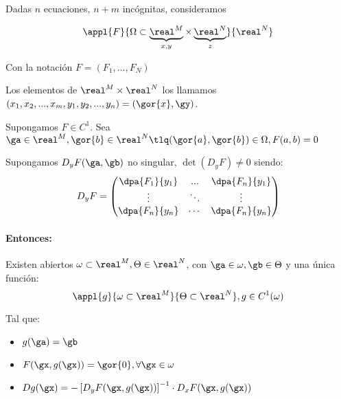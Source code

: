 \begin{theorem}\label{thmFImp}

Dadas $n$ ecuaciones, $n+m$ incógnitas, consideramos

$$\appl{F}{\Omega\subset\underbrace{\real^M}_{x,y} \times \underbrace{\real^N}_{z}}{\real^N}$$

Con la notación $F = (F_1,...,F_N)$

Los elementos de $\real^M\times\real^N$ los llamamos $(x_1,x_2,...,x_m,y_1,y_2,...,y_n) = (\gor{x},\gy)$.

Supongamos $F\in C^1$. Sea $\ga \in \real^M, \gor{b} \in \real^N \tlq (\gor{a},\gor{b})\in \Omega , F(a,b)=0$

Supongamos $D_yF(\ga,\gb)$ no singular, $\det(D_yF)\neq 0$ siendo:
$$D_yF = \begin{pmatrix}
          \dpa{F_1}{y_1}&...&\dpa{F_n}{y_1}\\
          \vdots&\ddots&\vdots\\
          \dpa{F_n}{y_n}&\cdots&\dpa{F_n}{y_n}
         \end{pmatrix}$$

\paragraph{Entonces:} Existen abiertos $\omega \subset \real^M, \Theta \in\real^N$, con $\ga \in \omega, \gb \in \Theta$ y una única función: \[ \appl{g}{\omega\subset\real^M}{\Theta \subset\real^N}, g\in C^1(\omega) \]

Tal que:
\begin{itemize}
 \item $g(\ga) = \gb$
 \item $F(\gx,g(\gx)) = \gor{0}, \forall \gx \in \omega$
 \item $\displaystyle Dg(\gx) = - \left[D_yF(\gx,g(\gx))\right]^{-1} \cdot D_xF(\gx,g(\gx))$
\end{itemize}
\end{theorem}

